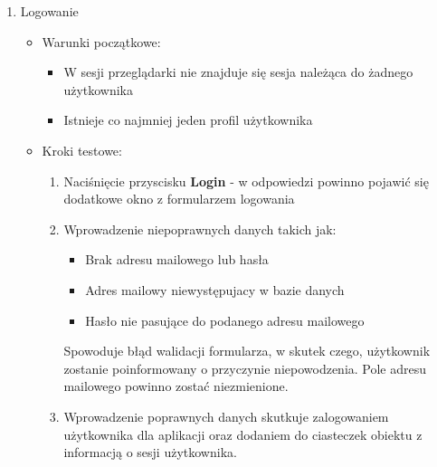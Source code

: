 \begin{enumerate}
 \item Logowanie 
  \begin{itemize}
   \item Warunki początkowe:
    \begin{itemize}
     \item W sesji przeglądarki nie znajduje się sesja należąca do żadnego użytkownika
     \item Istnieje co najmniej jeden profil użytkownika
    \end{itemize}
   \item Kroki testowe:
    \begin{enumerate}
     \item Naciśnięcie przyscisku \textbf{Login} - w odpowiedzi powinno pojawić się dodatkowe okno z formularzem logowania
     \item Wprowadzenie niepoprawnych danych takich jak:
      \begin{itemize}
       \item Brak adresu mailowego lub hasła
       \item Adres mailowy niewystępujacy w bazie danych
       \item Hasło nie pasujące do podanego adresu mailowego
      \end{itemize}
      Spowoduje błąd walidacji formularza, w skutek czego, użytkownik zostanie poinformowany o przyczynie niepowodzenia. Pole adresu mailowego powinno zostać niezmienione.
     \item Wprowadzenie poprawnych danych skutkuje zalogowaniem użytkownika dla aplikacji oraz dodaniem do ciasteczek obiektu z informacją o sesji użytkownika.
    \end{enumerate}
  \end{itemize}


\end{enumerate}
